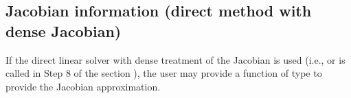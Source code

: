 \documentclass[letterpaper,10pt,english]{sphinxmanual}
\begin{document}
\subsection{Jacobian information (direct method with dense Jacobian)}
\label{c_interface/User_supplied:cinterface-densejacobianfn}\label{c_interface/User_supplied:jacobian-information-direct-method-with-dense-jacobian}
If the direct linear solver with dense treatment of the Jacobian is
used (i.e., {\hyperref[c_interface/User_callable:c.ARKDense]{\emph{}}} or {\hyperref[c_interface/User_callable:c.ARKLapackDense]{\emph{}}} is
called in Step 8 of the section {\hyperref[c_interface/Skeleton:cinterface-skeleton]{\emph{}}}), the user
may provide a function of type {\hyperref[c_interface/User_supplied:c.ARKDlsDenseJacFn]{\emph{}}} to provide
the Jacobian approximation.
\end{document}
